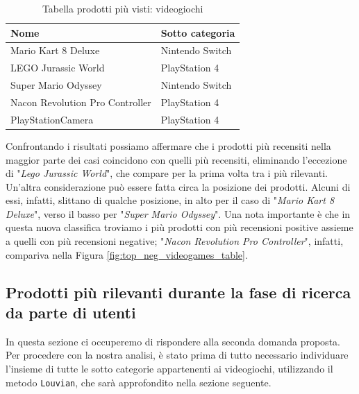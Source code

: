 			\begin{table} [H]
				\caption{Tabella prodotti più visti: videogiochi}
				\label{tab:top-five-videogames-network}
				\centering
				\begin{tabular}{ll}
					\toprule 
					\textbf{Nome} & \textbf{Sotto categoria} \\
					\midrule
					Mario Kart 8 Deluxe & Nintendo Switch \\
					LEGO Jurassic World & PlayStation 4 \\
					Super Mario Odyssey & Nintendo Switch \\
					Nacon Revolution Pro Controller & PlayStation 4 \\
					PlayStationCamera & PlayStation 4 \\
					\bottomrule
				\end{tabular}
			\end{table}
			
			Confrontando i risultati possiamo affermare che i prodotti più recensiti nella maggior parte dei casi coincidono con quelli più recensiti, eliminando l'eccezione di "\textit{Lego Jurassic World}", che compare per la prima volta tra i più rilevanti. Un'altra considerazione può essere fatta circa la posizione dei prodotti. Alcuni di essi, infatti, slittano di qualche posizione, in alto per il caso di "\textit{Mario Kart 8 Deluxe}", verso il basso per "\textit{Super Mario Odyssey}". Una nota importante è che in questa nuova classifica troviamo i più prodotti con più recensioni positive assieme a quelli con più recensioni negative; "\textit{Nacon Revolution Pro Controller}", infatti, compariva nella Figura \ref{fig:top_neg_videogames_table}. 
		
		\subsection{Prodotti più rilevanti durante la fase di ricerca da parte di utenti}
		\label{cap:rilevantProducts}
			In questa sezione ci occuperemo di rispondere alla seconda domanda proposta. Per procedere con la nostra analisi, è stato prima di tutto necessario individuare l'insieme di tutte le sotto categorie appartenenti ai videogiochi, utilizzando il metodo \verb|Louvian|, che sarà approfondito nella sezione seguente.
		
